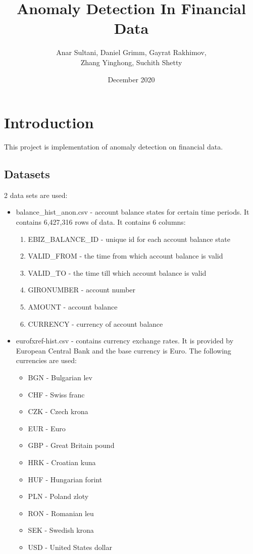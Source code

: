 \documentclass{article}
\title{Anomaly Detection In Financial Data}
\author{Anar Sultani, Daniel Grimm, Gayrat Rakhimov,\\ Zhang Yinghong, Suchith Shetty}
\date{December 2020}
\begin{document}
\maketitle

\section{Introduction}

This project is implementation of anomaly detection on financial data.

\subsection{Datasets}

2 data sets are used:
\begin{itemize}
    \item balance\_hist\_anon.csv - account balance states for certain time periods. It contains 6,427,316 rows of data.
    It contains 6 columns:
    \begin{enumerate}
    \item EBIZ\_BALANCE\_ID - unique id for each account balance state
    \item VALID\_FROM - the time from which account balance is valid
    \item VALID\_TO - the time till which account balance is valid
    \item GIRONUMBER - account number
    \item AMOUNT - account balance
    \item CURRENCY - currency of account balance
    \end{enumerate}
    \item eurofxref-hist.csv - contains currency exchange rates. It is provided by European Central Bank\cite{ecb} and the base currency is Euro. The following currencies are used:
\begin{itemize}
    \item BGN - Bulgarian lev
    \item CHF - Swiss franc
    \item CZK - Czech krona
    \item EUR - Euro
    \item GBP - Great Britain pound
    \item HRK - Croatian kuna
    \item HUF - Hungarian forint
    \item PLN - Poland zloty
    \item RON - Romanian leu
    \item SEK - Swedish krona
    \item USD - United States dollar
\end{itemize}
\end{itemize}
\end{document}
